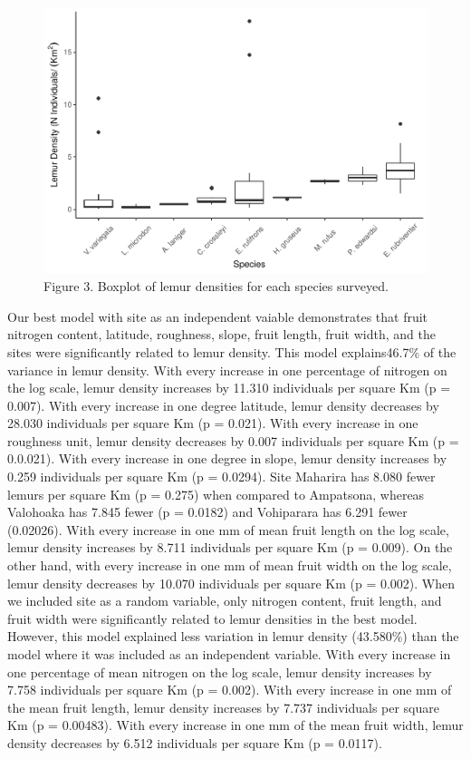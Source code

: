 \documentclass[
  12pt,
]{article}
\begin{document}
\begin{figure}
\centering
\includegraphics{project_draft_files/figure-latex/unnamed-chunk-9-1.pdf}
\caption{Figure 3. Boxplot of lemur densities for each species
surveyed.}
\end{figure}

Our best model with site as an independent vaiable demonstrates that
fruit nitrogen content, latitude, roughness, slope, fruit length, fruit
width, and the sites were significantly related to lemur density. This
model explains46.7\% of the variance in lemur density. With every
increase in one percentage of nitrogen on the log scale, lemur density
increases by 11.310 individuals per square Km (p = 0.007). With every
increase in one degree latitude, lemur density decreases by 28.030
individuals per square Km (p = 0.021). With every increase in one
roughness unit, lemur density decreases by 0.007 individuals per square
Km (p = 0.0.021). With every increase in one degree in slope, lemur
density increases by 0.259 individuals per square Km (p = 0.0294). Site
Maharira has 8.080 fewer lemurs per square Km (p = 0.275) when compared
to Ampatsona, whereas Valohoaka has 7.845 fewer (p = 0.0182) and
Vohiparara has 6.291 fewer (0.02026). With every increase in one mm of
mean fruit length on the log scale, lemur density increases by 8.711
individuals per square Km (p = 0.009). On the other hand, with every
increase in one mm of mean fruit width on the log scale, lemur density
decreases by 10.070 individuals per square Km (p = 0.002). When we
included site as a random variable, only nitrogen content, fruit length,
and fruit width were significantly related to lemur densities in the
best model. However, this model explained less variation in lemur
density (43.580\%) than the model where it was included as an
independent variable. With every increase in one percentage of mean
nitrogen on the log scale, lemur density increases by 7.758 individuals
per square Km (p = 0.002). With every increase in one mm of the mean
fruit length, lemur density increases by 7.737 individuals per square Km
(p = 0.00483). With every increase in one mm of the mean fruit width,
lemur density decreases by 6.512 individuals per square Km (p = 0.0117).
\end{document}
